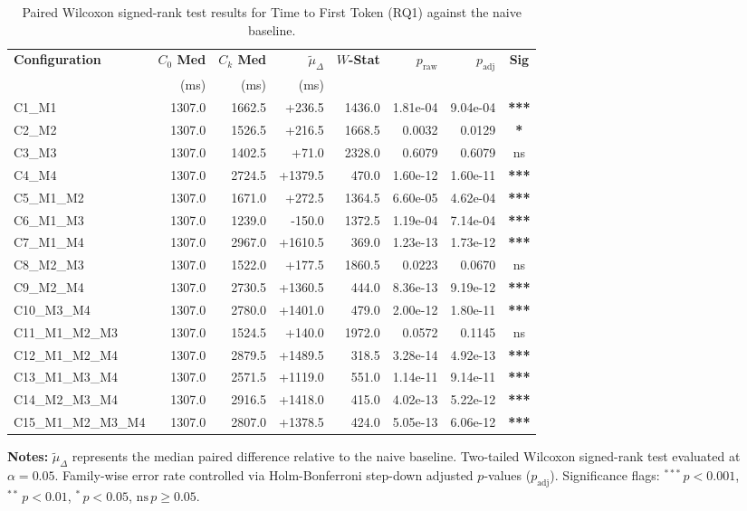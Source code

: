 \begin{table}[!htbp]
\centering
\small
\caption{Paired Wilcoxon signed-rank test results for Time to First Token (RQ1) against the naive baseline.}
\label{tab:wilcoxon_rq1_ttft}
\begin{tabular*}{\textwidth}{@{\extracolsep{\fill}} l r r r r r r c @{}}
\toprule
\textbf{Configuration} & \textbf{$C_0$ Med} & \textbf{$C_k$ Med} & \textbf{$\tilde{\mu}_\Delta$} & \textbf{$W$-Stat} & \textbf{$p_{\text{raw}}$} & \textbf{$p_{\text{adj}}$} & \textbf{Sig} \\
 & \scriptsize{(ms)} & \scriptsize{(ms)} & \scriptsize{(ms)} & & & & \\
\midrule
C1\_M1 & 1307.0 & 1662.5 & +236.5 & 1436.0 & 1.81e-04 & 9.04e-04 & \textbf{***} \\
C2\_M2 & 1307.0 & 1526.5 & +216.5 & 1668.5 & 0.0032 & 0.0129 & \textbf{*} \\
C3\_M3 & 1307.0 & 1402.5 & +71.0 & 2328.0 & 0.6079 & 0.6079 & ns \\
C4\_M4 & 1307.0 & 2724.5 & +1379.5 & 470.0 & 1.60e-12 & 1.60e-11 & \textbf{***} \\
C5\_M1\_M2 & 1307.0 & 1671.0 & +272.5 & 1364.5 & 6.60e-05 & 4.62e-04 & \textbf{***} \\
C6\_M1\_M3 & 1307.0 & 1239.0 & -150.0 & 1372.5 & 1.19e-04 & 7.14e-04 & \textbf{***} \\
C7\_M1\_M4 & 1307.0 & 2967.0 & +1610.5 & 369.0 & 1.23e-13 & 1.73e-12 & \textbf{***} \\
C8\_M2\_M3 & 1307.0 & 1522.0 & +177.5 & 1860.5 & 0.0223 & 0.0670 & ns \\
C9\_M2\_M4 & 1307.0 & 2730.5 & +1360.5 & 444.0 & 8.36e-13 & 9.19e-12 & \textbf{***} \\
C10\_M3\_M4 & 1307.0 & 2780.0 & +1401.0 & 479.0 & 2.00e-12 & 1.80e-11 & \textbf{***} \\
C11\_M1\_M2\_M3 & 1307.0 & 1524.5 & +140.0 & 1972.0 & 0.0572 & 0.1145 & ns \\
C12\_M1\_M2\_M4 & 1307.0 & 2879.5 & +1489.5 & 318.5 & 3.28e-14 & 4.92e-13 & \textbf{***} \\
C13\_M1\_M3\_M4 & 1307.0 & 2571.5 & +1119.0 & 551.0 & 1.14e-11 & 9.14e-11 & \textbf{***} \\
C14\_M2\_M3\_M4 & 1307.0 & 2916.5 & +1418.0 & 415.0 & 4.02e-13 & 5.22e-12 & \textbf{***} \\
C15\_M1\_M2\_M3\_M4 & 1307.0 & 2807.0 & +1378.5 & 424.0 & 5.05e-13 & 6.06e-12 & \textbf{***} \\
\bottomrule
\end{tabular*}
\vspace{0.5em}
\parbox{\textwidth}{\footnotesize
\textbf{Notes:} $\tilde{\mu}_\Delta$ represents the median paired difference relative to the naive baseline. Two-tailed Wilcoxon signed-rank test evaluated at $\alpha = 0.05$. Family-wise error rate controlled via Holm-Bonferroni step-down adjusted $p$-values ($p_{\text{adj}}$). Significance flags: $^{***}\,p < 0.001$, $^{**}\,p < 0.01$, $^{*}\,p < 0.05$, $\text{ns}\,p \ge 0.05$.}
\end{table}
